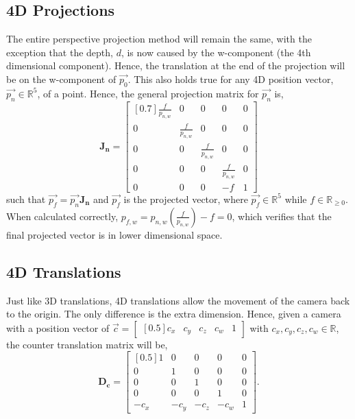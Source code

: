 \documentclass[12pt, letterpaper]{article}
\begin{document}
\subsection{4D Projections}
 The entire perspective projection method will remain the same, with the exception that the depth, $d$, is now caused by the w-component (the 4th dimensional component). Hence, the translation at the end of the projection will be on the w-component of $\vec{p_0}$. This also holds true for any 4D position vector, $\vec{p_n} \in \mathbb{R}^5$, of a point. Hence, the general projection matrix for $\vec{p_n}$ is, 
\begin{equation}
    \mathbf{J_n} = \begin{bmatrix}[0.7] \frac{f}{p_{n, w}} & 0 & 0 & 0 & 0\\ 0 & \frac{f}{p_{n, w}} & 0 & 0 & 0 \\ 0 & 0 & \frac{f}{p_{n, w}} & 0 & 0 \\ 0 & 0 & 0 & \frac{f}{p_{n, w}} & 0  \\ 0 & 0 & 0 & -f & 1   \end{bmatrix}
\end{equation}
such that $\vec{p_f} = \vec{p_n}\mathbf{J_n}$ and $\vec{p_f}$ is the projected vector, where $\vec{p_f} \in \mathbb{R}^5$ while $f \in \mathbb{R}_{\geq0}$. When calculated correctly, $p_{f,w} = p_{n,w} \left( \frac{f}{p_{n,w}}\right) - f = 0$, which verifies that the final projected vector is in lower dimensional space.

\subsection{4D Translations}
Just like 3D translations, 4D translations allow the movement of the camera back to the origin. The only difference is the extra dimension. Hence, given a camera with a position vector of $\vec{c} = \begin{bmatrix}[0.5] c_x & c_y & c_z& c_w & 1\end{bmatrix}$ with $c_x, c_y, c_z, c_w \in \mathbb{R}$, the counter translation matrix will be,
\begin{equation}
    \mathbf{D_c} = \begin{bmatrix}[0.5] 1 & 0 & 0 & 0 & 0 \\ 0 & 1 & 0 & 0 & 0 \\ 0 & 0 & 1 & 0 & 0 \\ 0 & 0 & 0 & 1 & 0 \\ -c_x & -c_y & -c_z & -c_w & 1 \end{bmatrix}.
\end{equation}
\end{document}
